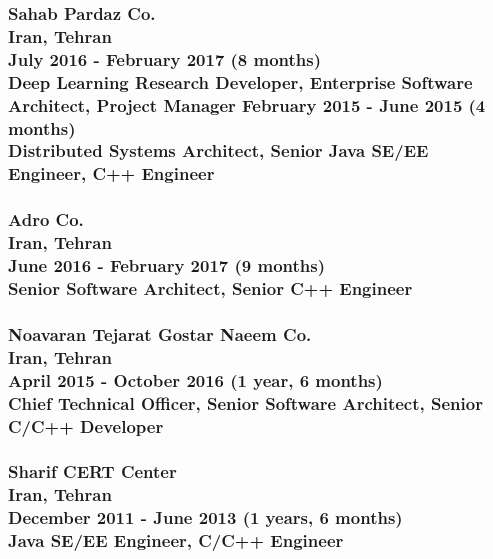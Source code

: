 \documentclass[10pt,a4paper]{article}
\begin{document}
\subsubsection{{ \textbullet \hspace{0.1cm} \large Sahab Pardaz Co.} \\
\textnormal{Iran, Tehran} \\
\textnormal{July 2016 - February 2017 (8 months)} \\
{Deep Learning Research Developer, Enterprise Software Architect, Project Manager}
\textnormal{February 2015 - June 2015 (4 months)} \\
{Distributed Systems Architect, Senior Java SE/EE Engineer, C++ Engineer}}
\vspace{0.3cm}

\subsubsection{{ \textbullet \hspace{0.1cm} \large Adro Co.} \\
\textnormal{Iran, Tehran} \\
\textnormal{June 2016 - February 2017 (9 months)} \\
{Senior Software Architect, Senior C++ Engineer}}
\vspace{0.3cm}

\subsubsection{{ \textbullet \hspace{0.1cm} \large Noavaran Tejarat Gostar Naeem Co.} \\
\textnormal{Iran, Tehran} \\
\textnormal{April 2015 - October 2016 (1 year, 6 months)} \\
{Chief Technical Officer, Senior Software Architect, Senior C/C++ Developer}}
\vspace{0.3cm}

\subsubsection{{ \textbullet \hspace{0.1cm} \large Sharif CERT Center} \\ 
\textnormal{Iran, Tehran} \\ 
\textnormal{December 2011 - June 2013 (1 years, 6 months)} \\ 
{Java SE/EE Engineer, C/C++ Engineer}}
\vspace{0.5cm}
\end{document}
